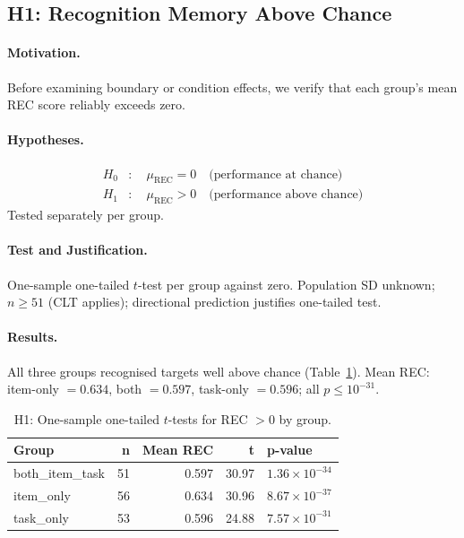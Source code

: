 \documentclass[10pt,a4paper]{article}
\begin{document}
\subsection*{H1: Recognition Memory Above Chance}

\paragraph{Motivation.}
Before examining boundary or condition effects, we verify that each group's mean REC score reliably exceeds zero.

\paragraph{Hypotheses.}
\begin{align*}
  H_0 &:\quad \mu_{\mathrm{REC}} = 0 \quad \text{(performance at chance)} \\
  H_1 &:\quad \mu_{\mathrm{REC}} > 0 \quad \text{(performance above chance)}
\end{align*}
Tested separately per group.

\paragraph{Test and Justification.}
One-sample one-tailed $t$-test per group against zero. Population SD unknown; $n \geq 51$ (CLT applies); directional prediction justifies one-tailed test.

\paragraph{Results.}
All three groups recognised targets well above chance (Table~\ref{tab:h1}). Mean REC: item-only $= 0.634$, both $= 0.597$, task-only $= 0.596$; all $p \leq 10^{-31}$.

\begin{table}[H]
\centering
\caption{H1: One-sample one-tailed $t$-tests for REC $> 0$ by group.}
\label{tab:h1}
\begin{tabular}{lrrrl}
\toprule
\textbf{Group} & \textbf{n} & \textbf{Mean REC} & \textbf{t} & \textbf{p-value} \\
\midrule
both\_item\_task & 51 & 0.597 & 30.97 & $1.36\times10^{-34}$ \\
item\_only       & 56 & 0.634 & 30.96 & $8.67\times10^{-37}$ \\
task\_only       & 53 & 0.596 & 24.88 & $7.57\times10^{-31}$ \\
\bottomrule
\end{tabular}
\end{table}
\end{document}
